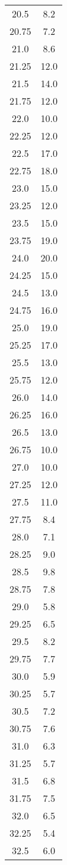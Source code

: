 \begin{table}
\begin{tabular}{S[]S[]}
20.5 & 8.2\\
20.75 & 7.2\\
21.0 & 8.6\\
21.25 & 12.0\\
21.5 & 14.0\\
21.75 & 12.0\\
22.0 & 10.0\\
22.25 & 12.0\\
22.5 & 17.0\\
22.75 & 18.0\\
23.0 & 15.0\\
23.25 & 12.0\\
23.5 & 15.0\\
23.75 & 19.0\\
24.0 & 20.0\\
24.25 & 15.0\\
24.5 & 13.0\\
24.75 & 16.0\\
25.0 & 19.0\\
25.25 & 17.0\\
25.5 & 13.0\\
25.75 & 12.0\\
26.0 & 14.0\\
26.25 & 16.0\\
26.5 & 13.0\\
26.75 & 10.0\\
27.0 & 10.0\\
27.25 & 12.0\\
27.5 & 11.0\\
27.75 & 8.4\\
28.0 & 7.1\\
28.25 & 9.0\\
28.5 & 9.8\\
28.75 & 7.8\\
29.0 & 5.8\\
29.25 & 6.5\\
29.5 & 8.2\\
29.75 & 7.7\\
30.0 & 5.9\\
30.25 & 5.7\\
30.5 & 7.2\\
30.75 & 7.6\\
31.0 & 6.3\\
31.25 & 5.7\\
31.5 & 6.8\\
31.75 & 7.5\\
32.0 & 6.5\\
32.25 & 5.4\\
32.5 & 6.0\\

\end{tabular}
\end{table}
